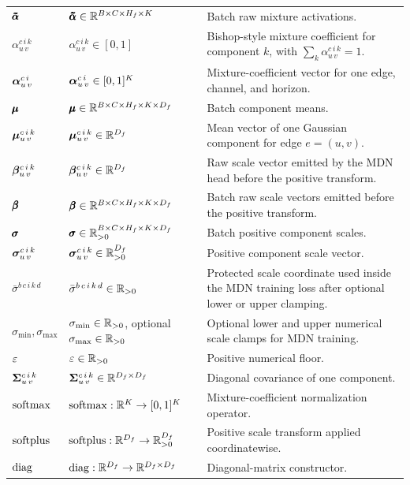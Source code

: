 \begin{center}
\begin{longtable}{>{\raggedright\arraybackslash}p{}
                  >{\raggedright\arraybackslash}p{}
                  >{\raggedright\arraybackslash}p{}}
$\pmb{\mathbf{\tilde{\alpha}}}$ & $\pmb{\mathbf{\tilde{\alpha}}} \in \mathbb{R}^{B \times C \times H_f \times K}$ & Batch raw mixture activations. \\
$\alpha_{u\,v}^{c\,i\,k}$ & $\alpha_{u\,v}^{c\,i\,k}\in[0,1]$ & Bishop-style mixture coefficient for component $k$, with $\sum_k \alpha_{u\,v}^{c\,i\,k}=1$. \\
$\bm{\alpha}_{u\,v}^{c\,i}$ & $\bm{\alpha}_{u\,v}^{c\,i} \in [0,1]^K$ & Mixture-coefficient vector for one edge, channel, and horizon. \\
$\pmb{\mathbf{\mu}}$ & $\pmb{\mathbf{\mu}} \in \mathbb{R}^{B \times C \times H_f \times K \times D_f}$ & Batch component means. \\
$\bm{\mu}_{u\,v}^{c\,i\,k}$ & $\bm{\mu}_{u\,v}^{c\,i\,k} \in \mathbb{R}^{D_f}$ & Mean vector of one Gaussian component for edge $e=(u,v)$. \\
$\bm{\beta}_{u\,v}^{c\,i\,k}$ & $\bm{\beta}_{u\,v}^{c\,i\,k} \in \mathbb{R}^{D_f}$ & Raw scale vector emitted by the MDN head before the positive transform. \\
$\pmb{\mathbf{\beta}}$ & $\pmb{\mathbf{\beta}} \in \mathbb{R}^{B \times C \times H_f \times K \times D_f}$ & Batch raw scale vectors emitted before the positive transform. \\
$\pmb{\mathbf{\sigma}}$ & $\pmb{\mathbf{\sigma}} \in \mathbb{R}_{>0}^{B \times C \times H_f \times K \times D_f}$ & Batch positive component scales. \\
$\bm{\sigma}_{u\,v}^{c\,i\,k}$ & $\bm{\sigma}_{u\,v}^{c\,i\,k} \in \mathbb{R}_{>0}^{D_f}$ & Positive component scale vector. \\
$\bar{\sigma}^{b\,c\,i\,k\,d}$ & $\bar{\sigma}^{b\,c\,i\,k\,d}\in\mathbb{R}_{>0}$ & Protected scale coordinate used inside the MDN training loss after optional lower or upper clamping. \\
$\sigma_{\min},\sigma_{\max}$ & $\sigma_{\min}\in\mathbb{R}_{>0}$, optional $\sigma_{\max}\in\mathbb{R}_{>0}$ & Optional lower and upper numerical scale clamps for MDN training. \\
$\varepsilon$ & $\varepsilon \in \mathbb{R}_{>0}$ & Positive numerical floor. \\
$\bm{\Sigma}_{u\,v}^{c\,i\,k}$ & $\bm{\Sigma}_{u\,v}^{c\,i\,k} \in \mathbb{R}^{D_f \times D_f}$ & Diagonal covariance of one component. \\
$\operatorname{softmax}$ & $\operatorname{softmax}:\mathbb{R}^K\rightarrow[0,1]^K$ & Mixture-coefficient normalization operator. \\
$\operatorname{softplus}$ & $\operatorname{softplus}:\mathbb{R}^{D_f}\rightarrow\mathbb{R}_{>0}^{D_f}$ & Positive scale transform applied coordinatewise. \\
$\operatorname{diag}$ & $\operatorname{diag}:\mathbb{R}^{D_f}\rightarrow\mathbb{R}^{D_f \times D_f}$ & Diagonal-matrix constructor. \\

\end{longtable}
\end{center}
